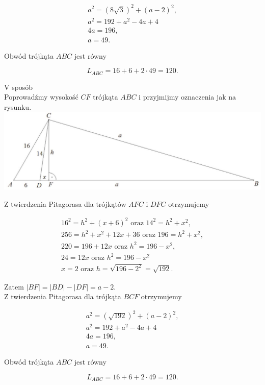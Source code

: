 \documentclass[10pt]{article}
\begin{document}
$$
\begin{gathered}
a^{2}=(8 \sqrt{3})^{2}+(a-2)^{2}, \\
a^{2}=192+a^{2}-4 a+4 \\
4 a=196, \\
a=49 .
\end{gathered}
$$

Obwód trójkąta $A B C$ jest równy

$$
L_{A B C}=16+6+2 \cdot 49=120 .
$$

V sposób\\
Poprowadźmy wysokość $C F$ trójkąta $A B C$ i przyjmijmy oznaczenia jak na rysunku.\\
\includegraphics[max width=\textwidth, center]{2025_02_07_d712b9a47aa2c64928dbg-27}

Z twierdzenia Pitagorasa dla trójkątów $A F C$ i $D F C$ otrzymujemy

$$
\begin{gathered}
16^{2}=h^{2}+(x+6)^{2} \text { oraz } 14^{2}=h^{2}+x^{2}, \\
256=h^{2}+x^{2}+12 x+36 \text { oraz } 196=h^{2}+x^{2}, \\
220=196+12 x \text { oraz } h^{2}=196-x^{2}, \\
24=12 x \text { oraz } h^{2}=196-x^{2} \\
x=2 \text { oraz } h=\sqrt{196-2^{2}}=\sqrt{192} .
\end{gathered}
$$

Zatem $|B F|=|B D|-|D F|=a-2$.\\
Z twierdzenia Pitagorasa dla trójkąta $B C F$ otrzymujemy

$$
\begin{gathered}
a^{2}=(\sqrt{192})^{2}+(a-2)^{2}, \\
a^{2}=192+a^{2}-4 a+4 \\
4 a=196, \\
a=49 .
\end{gathered}
$$

Obwód trójkąta $A B C$ jest równy

$$
L_{A B C}=16+6+2 \cdot 49=120 .
$$
\end{document}
